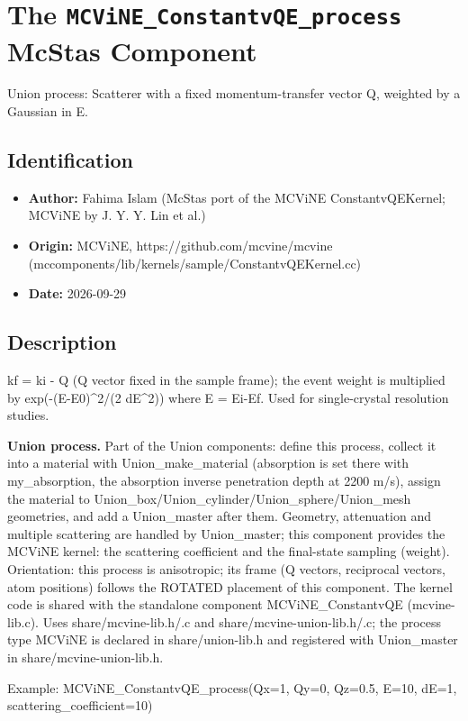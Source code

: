 \section{The \texttt{MCViNE\_ConstantvQE\_process} McStas Component}
Union process: Scatterer with a fixed momentum-transfer vector Q, weighted by a Gaussian in E.

\subsection*{Identification}
\begin{itemize}
  \item \textbf{Author:} Fahima Islam (McStas port of the MCViNE ConstantvQEKernel; MCViNE by J. Y. Y. Lin et al.)
  \item \textbf{Origin:} MCViNE, https://github.com/mcvine/mcvine (mccomponents/lib/kernels/sample/ConstantvQEKernel.cc)
  \item \textbf{Date:} 2026-09-29
\end{itemize}

\subsection*{Description}
kf = ki - Q (Q vector fixed in the sample frame); the event weight is multiplied by exp(-(E-E0)\textasciicircum{}2/(2 dE\textasciicircum{}2)) where E = Ei-Ef. Used for single-crystal resolution studies.

\textbf{Union process.} Part of the Union components: define this process, collect it into a material with Union\_make\_material (absorption is set there with my\_absorption, the absorption inverse penetration depth at 2200 m/s), assign the material to Union\_box/Union\_cylinder/Union\_sphere/Union\_mesh geometries, and add a Union\_master after them. Geometry, attenuation and multiple scattering are handled by Union\_master; this component provides the MCViNE kernel: the scattering coefficient and the final-state sampling (weight). Orientation: this process is anisotropic; its frame (Q vectors, reciprocal vectors, atom positions) follows the ROTATED placement of this component. The kernel code is shared with the standalone component MCViNE\_ConstantvQE (mcvine-lib.c). Uses share/mcvine-lib.h/.c and share/mcvine-union-lib.h/.c; the process type MCViNE is declared in share/union-lib.h and registered with Union\_master in share/mcvine-union-lib.h.

Example: MCViNE\_ConstantvQE\_process(Qx=1, Qy=0, Qz=0.5, E=10, dE=1, scattering\_coefficient=10)

